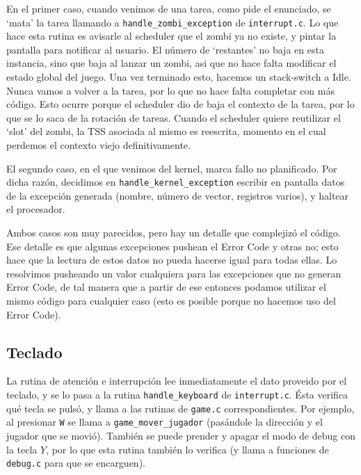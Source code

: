 \documentclass{article}
\begin{document}
	En el primer caso, cuando venimos de una tarea, como pide el enunciado, se `mata' la tarea llamando a \texttt{handle\_zombi\_exception} de \texttt{interrupt.c}. Lo que hace esta rutina es avisarle al scheduler que el zombi ya no existe, y pintar la pantalla para notificar al usuario. El número de `restantes' no baja en esta instancia, sino que baja al lanzar un zombi, asi que no hace falta modificar el estado global del juego. Una vez terminado esto, hacemos un stack-switch a Idle. Nunca vamos a volver a la tarea, por lo que no hace falta completar con más código. Esto ocurre porque el scheduler dio de baja el contexto de la tarea, por lo que se lo saca de la rotación de tareas. Cuando el scheduler quiere reutilizar el `slot' del zombi, la TSS asociada al mismo es reescrita, momento en el cual perdemos el contexto viejo definitivamente. 

	El segundo caso, en el que venimos del kernel, marca fallo no planificado. Por dicha razón, decidimos en \texttt{handle\_kernel\_exception} escribir en pantalla datos de la excepción generada (nombre, número de vector, registros varios), y haltear el procesador.

	Ambos casos son muy parecidos, pero hay un detalle que complejizó el código. Ese detalle es que algunas excepciones pushean el Error Code y otras no; esto hace que la lectura de estos datos no pueda hacerse igual para todas ellas. Lo resolvimos pusheando un valor cualquiera para las excepciones que no generan Error Code, de tal manera que a partir de ese entonces podamos utilizar el mismo código para cualquier caso (esto es posible porque no hacemos uso del Error Code).

	\subsection*{Teclado}

	La rutina de atención e interrupción lee inmediatamente el dato proveido por el teclado, y se lo pasa a la rutina \texttt{handle\_keyboard} de \texttt{interrupt.c}. Ésta verifica qué tecla se pulsó, y llama a las rutinas de \texttt{game.c} correspondientes. Por ejemplo, al presionar \texttt{W} se llama a \texttt{game\_mover\_jugador} (pasándole la dirección y el jugador que se movió). También se puede prender y apagar el modo de debug con la tecla $Y$, por lo que esta rutina también lo verifica (y llama a funciones de \texttt{debug.c} para que se encarguen).
\end{document}
